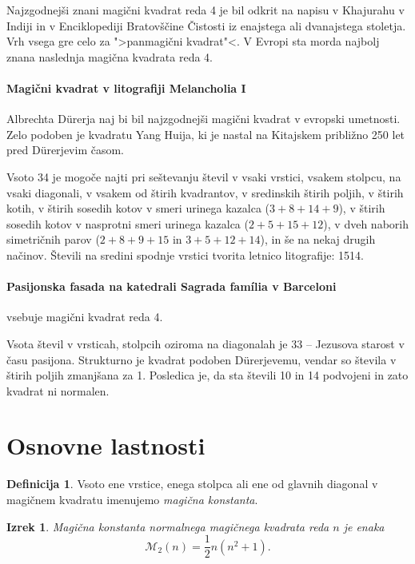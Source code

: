 \documentclass[a4paper,12pt]{article}
\theoremstyle{definition}
\newtheorem{definicija}{Definicija}
\newtheorem{izrek}{Izrek}
\begin{document}
Najzgodnejši znani magični kvadrat reda 4 je bil odkrit na napisu
v Khajurahu v Indiji in v Enciklopediji Bratovščine Čistosti iz enajstega
ali dvanajstega stoletja. Vrh vsega gre celo za ">panmagični kvadrat"<.
V Evropi sta morda najbolj znana naslednja magična kvadrata reda 4.

\paragraph{Magični kvadrat v litografiji Melancholia I}
Albrechta Dürerja naj bi bil najzgodnejši magični kvadrat
v evropski umetnosti. Zelo podoben je kvadratu Yang Huija, ki je nastal na Kitajskem
približno 250 let pred Dürerjevim časom.

Vsoto 34 je mogoče najti pri seštevanju števil v vsaki vrstici, vsakem stolpcu,
na vsaki diagonali, v vsakem od štirih kvadrantov, v sredinskih štirih poljih,
v štirih kotih, v štirih sosedih kotov v smeri urinega kazalca (\(3+8+14+9\)), v
štirih sosedih kotov v nasprotni smeri urinega kazalca (\(2+5+15+12\)), v dveh naborih
simetričnih parov (\(2+8+9+15\) in \(3+5+12+14\)), in še na nekaj drugih načinov.
Števili na sredini spodnje vrstici tvorita letnico litografije: 1514.

\paragraph{Pasijonska fasada na katedrali Sagrada família v Barceloni}
vsebuje magični kvadrat reda 4.

Vsota števil v vrsticah, stolpcih oziroma na diagonalah je 33 -- Jezusova starost
v času pasijona. Strukturno je kvadrat podoben Dürerjevemu, vendar so števila
v štirih poljih zmanjšana za 1. Posledica je, da sta števili 10 in 14 podvojeni
in zato kvadrat ni normalen.


\section{Osnovne lastnosti}

\begin{definicija}
      Vsoto ene vrstice, enega stolpca ali ene od glavnih diagonal
      v magičnem kvadratu imenujemo \emph{magična konstanta}.
\end{definicija}

\begin{izrek}
   \emph{Magična konstanta normalnega magičnega kvadrata reda \(n\)
   je enaka}
   \begin{equation}
      \label{eq:mc}
      \mathcal{M}_2(n) = \frac{1}{2}n(n^2 + 1).
   \end{equation}
\end{izrek}
\end{document}
